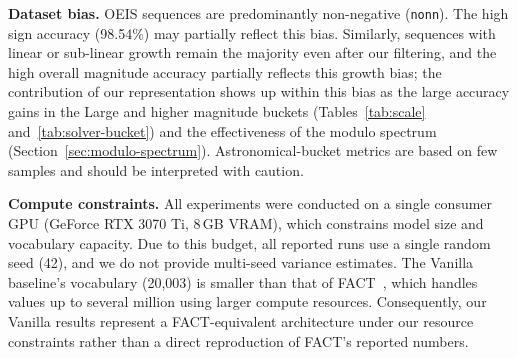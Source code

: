 \textbf{Dataset bias.} OEIS sequences are predominantly non-negative (\texttt{nonn}).
The high sign accuracy (98.54\%) may partially reflect this bias.
Similarly, sequences with linear or sub-linear growth remain the majority even after our
filtering, and the high overall magnitude accuracy partially reflects this growth bias;
the contribution of our representation shows up within this bias as the large accuracy gains
in the Large and higher magnitude buckets (Tables~\ref{tab:scale} and~\ref{tab:solver-bucket})
and the effectiveness of the modulo spectrum (Section~\ref{sec:modulo-spectrum}).
Astronomical-bucket metrics are based on few samples and should be interpreted with caution.

\textbf{Compute constraints.} All experiments were conducted on a single consumer GPU
(GeForce RTX 3070 Ti, 8\,GB VRAM), which constrains model size and vocabulary capacity.
Due to this budget, all reported runs use a single random seed (42), and we do not provide
multi-seed variance estimates.
The Vanilla baseline's vocabulary (20,003) is smaller than that of
FACT~\cite{zurich-fact}, which handles values up to several million using larger compute
resources. Consequently, our Vanilla results represent a FACT-equivalent architecture under
our resource constraints rather than a direct reproduction of FACT's reported numbers.
